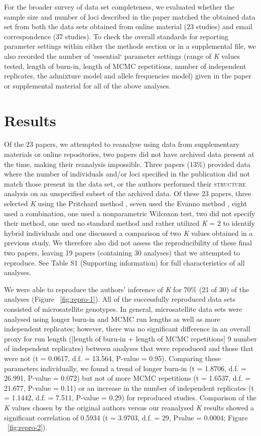 For the broader survey of data set completeness, we evaluated whether the sample size and number of 
loci described in the paper matched the obtained data set from both the data sets obtained from online 
material (23 studies) and email correspondence (37 studies). To check the overall standards for 
reporting parameter settings within either the methods section or in a supplemental file, we also 
recorded the number of `essential` parameter settings (range of \emph{K} values tested, length of 
burn-in, length of MCMC repetitions, number of independent replicates, the admixture model and 
allele frequencies model) given in the paper or supplemental material for all of the above analyses.

\section{Results}
Of the 23 papers, we attempted to reanalyse using data from supplementary materials or online 
repositories, two papers did not have archived data present at the time, making their reanalysis 
impossible. Three papers (13\%) provided data where the number of individuals and/or loci specified 
in the publication did not match those present in the data set, or the authors performed their 
\textsc{structure} analysis on an unspecified subset of the archived data. Of these 23 papers, 
three selected \emph{K} using the Pritchard method \citep{Pritchard:2000}, seven used the Evanno 
method \citep{Evanno:2005}, eight used a combination, one used a nonparametric Wilcoxon test, 
two did not specify their method, one used no standard method and rather utilized \emph{K} = 2 to 
identify hybrid individuals and one discussed a comparison of two \emph{K} values obtained in a 
previous study. We therefore also did not assess the reproducibility of these final two papers, 
leaving 19 papers (containing 30 analyses) that we attempted to reproduce. See Table S1 (Supporting information) 
for full characteristics of all analyses.

We were able to reproduce the authors' inference of \emph{K} for 70\% (21 of 30) of the analyses 
(Figure ~\ref{fig:repro-1}). All of the successfully reproduced data sets consisted of microsatellite 
genotypes. In general, microsatellite data sets were analysed using longer burn-in and MCMC run 
lengths as well as more independent replicates; however, there was no significant difference in 
an overall proxy for run length ([length of burn-in + length of MCMC repetitions] 9 number of independent replicates) between 
analyses that were reproduced and those that were not (t = 0.0617, d.f. = 13.564, P-value = 0.95). 
Comparing these parameters individually, we found a trend of longer burn-in (t = 1.8706, d.f. = 26.991, P-value = 0.072) 
but not of more MCMC repetitions (t = 1.6537, d.f. = 21.677, P-value = 0.11) or an increase in the 
number of independent replicates (t = 1.1442, d.f. = 7.511, P-value = 0.29) for reproduced studies. 
Comparison of the \emph{K} values chosen by the original authors versus our reanalysed \emph{K} results 
showed a significant correlation of 0.5934 (t = 3.9703, d.f. = 29, Pvalue = 0.0004; Figure ~\ref{fig:repro-2}).

